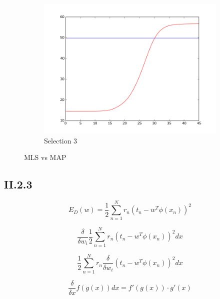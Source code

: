 \documentclass{article}
\begin{document}
\begin{figure}[!ht]
\begin{subfigure}[b]{0.4\textwidth}
        \includegraphics[width=\textwidth]{Part2/II223.png}
        \caption{Selection 3}
    \end{subfigure}
    \caption{MLS vs MAP}
    \label{fig:II22}
\end{figure}




\subsection{II.2.3}

\begin{equation*}
    E_{D}(w) = \frac{1}{2} \sum_{n=1}^{N} r_n(t_n - w^T\phi(x_n))^2
\end{equation*}

\begin{equation*}
    \frac{\delta}{\delta w_i} \frac{1}{2}\sum_{n=1}^{N} r_n(t_n - w^T\phi(x_n))^2 dx
\end{equation*}

\begin{equation*}
    \frac{1}{2}\sum_{n=1}^{N} r_n \frac{\delta}{\delta w_i} (t_n - w^T\phi(x_n))^2 dx
\end{equation*}

\begin{equation}
    \frac{\delta}{\delta x} f(g(x)) dx = f'(g(x)) \cdot g'(x)
\end{equation}
\end{document}
